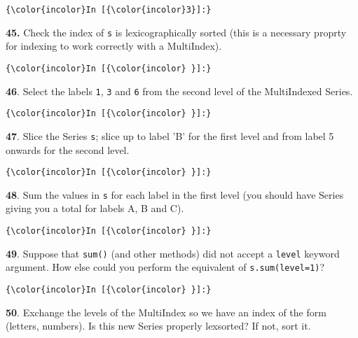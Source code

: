 \documentclass[11pt]{article}
\begin{document}
    \begin{Verbatim}[commandchars=\\\{\}]
{\color{incolor}In [{\color{incolor}3}]:} 
\end{Verbatim}


    \textbf{45.} Check the index of \texttt{s} is lexicographically sorted
(this is a necessary proprty for indexing to work correctly with a
MultiIndex).

    \begin{Verbatim}[commandchars=\\\{\}]
{\color{incolor}In [{\color{incolor} }]:} 
\end{Verbatim}


    \textbf{46}. Select the labels \texttt{1}, \texttt{3} and \texttt{6}
from the second level of the MultiIndexed Series.

    \begin{Verbatim}[commandchars=\\\{\}]
{\color{incolor}In [{\color{incolor} }]:} 
\end{Verbatim}


    \textbf{47}. Slice the Series \texttt{s}; slice up to label 'B' for the
first level and from label 5 onwards for the second level.

    \begin{Verbatim}[commandchars=\\\{\}]
{\color{incolor}In [{\color{incolor} }]:} 
\end{Verbatim}


    \textbf{48}. Sum the values in \texttt{s} for each label in the first
level (you should have Series giving you a total for labels A, B and C).

    \begin{Verbatim}[commandchars=\\\{\}]
{\color{incolor}In [{\color{incolor} }]:} 
\end{Verbatim}


    \textbf{49}. Suppose that \texttt{sum()} (and other methods) did not
accept a \texttt{level} keyword argument. How else could you perform the
equivalent of \texttt{s.sum(level=1)}?

    \begin{Verbatim}[commandchars=\\\{\}]
{\color{incolor}In [{\color{incolor} }]:} 
\end{Verbatim}


    \textbf{50}. Exchange the levels of the MultiIndex so we have an index
of the form (letters, numbers). Is this new Series properly lexsorted?
If not, sort it.
\end{document}
